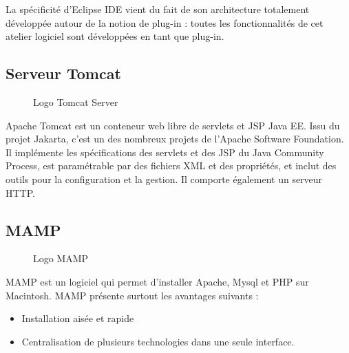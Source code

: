 La spécificité d'Eclipse IDE vient du fait de son architecture totalement développée autour de la notion de plug-in : toutes les fonctionnalités de cet atelier logiciel sont développées en tant que plug-in.

\subsection{Serveur Tomcat}
\begin{figure}[H]
    \centering
    \caption{Logo Tomcat Server }
\end{figure}
Apache Tomcat est un conteneur web libre de servlets et JSP Java EE. Issu du projet Jakarta, c'est un des nombreux projets de l’Apache Software Foundation. Il implémente les spécifications des servlets et des JSP du Java Community Process, est paramétrable par des fichiers XML et des propriétés, et inclut des outils pour la configuration et la gestion. Il comporte également un serveur HTTP.
\subsection{MAMP}
\begin{figure}[H]
    \centering
    \caption{Logo MAMP }
\end{figure}
MAMP est un logiciel qui permet d'installer Apache, Mysql et PHP sur Macintosh.
MAMP présente surtout les avantages suivants : 
\begin{itemize}
    \item Installation aisée et rapide 
    \item Centralisation de plusieurs technologies dans une seule interface.
\end{itemize}

